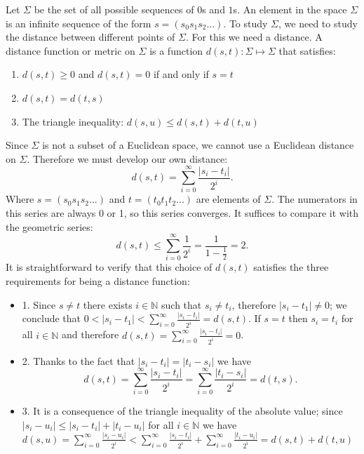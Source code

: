 \documentclass[12pt,a4paper]{report}
\theoremstyle{definition}
\begin{document}
Let \(\Sigma\) be the set of all possible sequences of $0$s and $1$s. An element in the space \(\Sigma\) is an infinite sequence of the form \(s=(s_{0}s_{1}s_{2}...)\). To study \(\Sigma\), we need to study the distance between different points of \(\Sigma\). For this we need a distance. A distance function or metric on \(\Sigma\) is a function \(d(s,t) : \Sigma \mapsto \Sigma\) that satisfies:
\begin{enumerate}
    \item  \(d(s,t)\ge0\) and \(d(s,t)=0\) if and only if \(s=t\)
    \item  \(d(s,t)=d(t,s)\)
    \item  The triangle inequality: \(d(s,u)\le d(s,t)+d(t,u)\)
\end{enumerate}
%
Since \(\Sigma\) is not a subset of a Euclidean space, we cannot use a Euclidean distance on \(\Sigma\). Therefore we must develop our own distance:
\[
d(s,t)=\sum_{i=0}^{\infty}\frac{|s_{i}-t_{i}|}{2^{i}}.
\]
%
Where \(s=(s_{0}s_{1}s_{2}...)\) and \(t=(t_{0}t_{1}t_{2}...)\) are elements of \(\Sigma\). The numerators in this series are always 0 or 1, so this series converges. It suffices to compare it with the geometric series:
\[
d(s,t)\le\sum_{i=0}^{\infty}\frac{1}{2^{i}}=\frac{1}{1-\frac{1}{2}}=2.
\]
%
It is straightforward to verify that this choice of \(d(s,t)\) satisfies the three requirements for being a distance function:
\begin{itemize}
    \item 1. Since $s \neq t$ there exists $i \in \mathbb{N}$ such that $s_i \neq t_i$, therefore $|s_i - t_1| \neq 0$; we conclude that $ 0 < |s_i - t_1| < \sum_{i=0}^{\infty}\frac{|s_{i}-t_{i}|}{2^{i}} = d(s,t)$. If $s = t$ then $s_i = t_i$ for all $i \in \mathbb{N}$ and therefore $d(s,t) = \sum_{i=0}^{\infty}\frac{|s_{i}-t_{i}|}{2^{i}} = 0$.
    \item 2. Thanks to the fact that $|s_i - t_i| = |t_i - s_i|$ we have \[d(s,t) = \sum_{i=0}^{\infty}\frac{|s_{i}-t_{i}|}{2^{i}} = \sum_{i=0}^{\infty}\frac{|t_{i}-s_{i}|}{2^{i}} = d(t,s).\]
    \item 3. It is a consequence of the triangle inequality of the absolute value; since $|s_i - u_i| \leq |s_i - t_i| + |t_i - u_i|$ for all  $i \in \mathbb{N}$ we have 
    $d(s,u) = \sum_{i=0}^{\infty}\frac{|s_{i}-u_{i}|}{2^{i}} < \sum_{i=0}^{\infty}\frac{|s_{i}-t_{i}|}{2^{i}} + \sum_{i=0}^{\infty}\frac{|t_{i}-u_{i}|}{2^{i}} = d(s,t) + d(t,u)$
    
\end{itemize}
\end{document}
